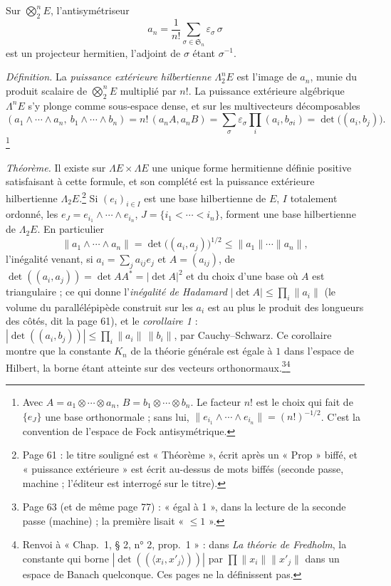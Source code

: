 \documentclass[11pt,a4paper]{article}
\begin{document}
Sur $\bigotimes^n_2 E$, l'antisymétriseur
\[
  a_n = \frac{1}{n!} \sum_{\sigma \in \mathfrak{S}_n} \varepsilon_\sigma\,\sigma
\]
est un projecteur hermitien, l'adjoint de $\sigma$ étant $\sigma^{-1}$.

\emph{Définition.} La \emph{puissance extérieure hilbertienne} $\Lambda^n_2 E$
est l'image de $a_n$, munie du produit scalaire de $\bigotimes^n_2 E$
multiplié par $n!$. La puissance extérieure algébrique $\Lambda^n E$ s'y
plonge comme sous-espace dense, et sur les multivecteurs décomposables
\[
  (a_1 \wedge \cdots \wedge a_n,\ b_1 \wedge \cdots \wedge b_n)
  = n!\,(a_n A, a_n B) = \sum_\sigma \varepsilon_\sigma \prod_i (a_i, b_{\sigma i})
  = \det\bigl((a_i, b_j)\bigr) .
\]
\footnote{Avec $A = a_1 \otimes \cdots \otimes a_n$, $B = b_1 \otimes \cdots
\otimes b_n$. Le facteur $n!$ est le choix qui fait de $\{e_J\}$ une base
orthonormale ; sans lui, $\|e_{i_1} \wedge \cdots \wedge e_{i_n}\| =
(n!)^{-1/2}$. C'est la convention de l'espace de Fock antisymétrique.}

\emph{Théorème.} Il existe sur $\Lambda E \times \Lambda E$ une unique
forme hermitienne définie positive satisfaisant à cette formule, et son
complété est la puissance extérieure hilbertienne $\Lambda_2 E$.\footnote{Page
61 : le titre souligné est « Théorème », écrit après un « Prop » biffé, et
« puissance extérieure » est écrit au-dessus de mots biffés (seconde passe,
machine ; l'éditeur est interrogé sur le titre).} Si $(e_i)_{i \in I}$ est une base hilbertienne de
$E$, $I$ totalement ordonné, les $e_J = e_{i_1} \wedge \cdots \wedge e_{i_n}$,
$J = \{i_1 < \cdots < i_n\}$, forment une base hilbertienne de $\Lambda_2 E$.
En particulier
\[
  \|a_1 \wedge \cdots \wedge a_n\| = \det\bigl((a_i, a_j)\bigr)^{1/2}
  \leq \|a_1\| \cdots \|a_n\|,
\]
l'inégalité venant, si $a_i = \sum_j a_{ij} e_j$ et $A = (a_{ij})$, de
$\det((a_i, a_j)) = \det AA^{*} = |\det A|^2$ et du choix d'une base où $A$
est triangulaire ; ce qui donne l'\emph{inégalité de Hadamard}
$|\det A| \leq \prod_i \|a_i\|$ (le volume du parallélépipède construit
sur les $a_i$ est au plus le produit des longueurs des côtés, dit la page 61),
et le \emph{corollaire 1} : $|\det((a_i, b_j))| \leq \prod_i
\|a_i\|\,\|b_i\|$, par Cauchy--Schwarz. Ce corollaire montre que la constante
$K_n$ de la théorie générale est égale à $1$ dans l'espace de Hilbert, la
borne étant atteinte sur des vecteurs orthonormaux.\footnote{Page 63 (et de
même page 77) : « égal à 1 », dans la lecture de la seconde passe (machine) ;
la première lisait « $\leq 1$ ».}\footnote{Renvoi à « Chap.\ 1, § 2, n° 2,
prop.\ 1 » : dans \emph{La théorie de Fredholm}, la constante qui borne
$|\det((\langle x_i, x'_j\rangle))|$ par $\prod \|x_i\|\|x'_j\|$ dans un
espace de Banach quelconque. Ces pages ne la définissent pas.}
\end{document}
